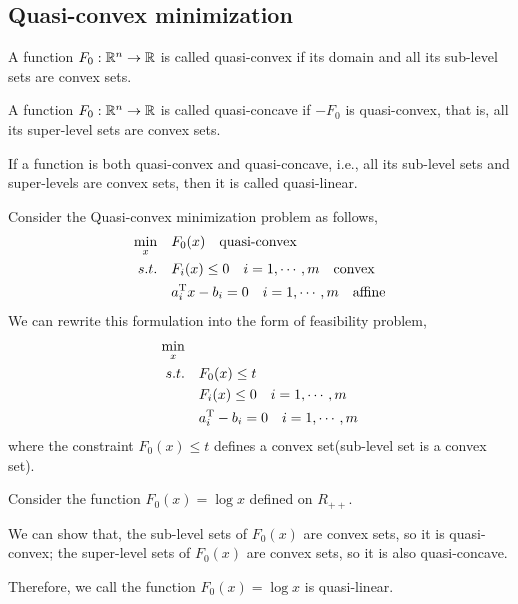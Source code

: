 \subsection{Quasi-convex minimization}
\begin{definition}
A function $F_0: \mathbb{R}^n\to\mathbb{R}$ is called quasi-convex if its domain and all
its sub-level sets are convex sets. 
\end{definition}

\begin{definition}
A function $F_0: \mathbb{R}^n\to\mathbb{R}$ is called quasi-concave if $-F_0$ is quasi-convex, that is, all its super-level sets are convex sets.
\end{definition}

\begin{definition}
If a function is both quasi-convex and quasi-concave, i.e., all its sub-level sets and super-levels are convex sets, then it is called quasi-linear.
\end{definition}

Consider the Quasi-convex minimization problem as follows,
\begin{align*}
\min_x\quad & F_0(x) \quad \text{quasi-convex}\\
s.t.\quad & F_i(x) \leq 0 \quad i = 1,\cdots,m\quad \text{convex}\\
& a_i^{{\rm T}}x - b_i = 0\quad i = 1,\cdots,m \quad \text{affine}
\end{align*}
We can rewrite this formulation into the form of feasibility problem,
\begin{align*}
\min_x\quad & \\%
s.t.\quad  & F_0(x) \leq t  \\
& F_i(x) \leq 0 \quad i = 1,\cdots,m \\
& a_i^{\trans} - b_i = 0\quad i = 1,\cdots,m
\end{align*}
where the constraint $F_0(x) \leq t$ defines a convex set(sub-level set is a convex set).

\begin{example}
	Consider the function $F_0(x) = \log x$ defined on $R_{++}$.
	
	We can show that, the sub-level sets of $F_0(x)$ are convex sets, so it is quasi-convex; the super-level sets of $F_0(x)$ are convex sets, so it is also quasi-concave. 
	
	Therefore, we call the function $F_0(x) = \log x$ is quasi-linear.
\end{example}



